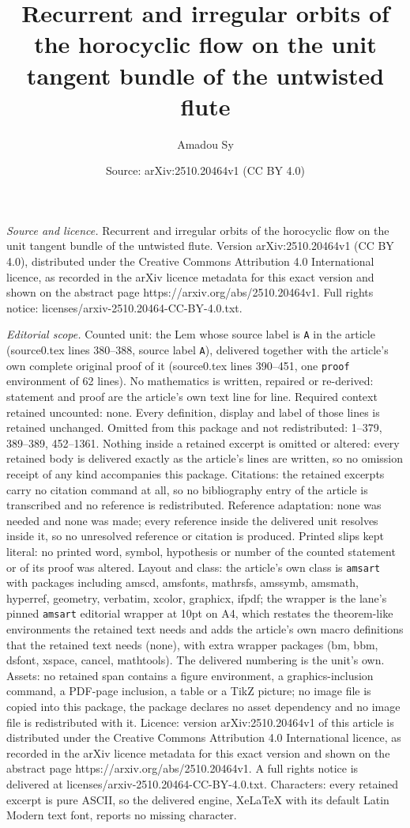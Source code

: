 \documentclass[10pt,a4paper]{amsart}
\title[Recurrent and irregular orbits of the horocyclic flow on the]{Recurrent and irregular orbits of the horocyclic flow on the unit tangent bundle of the untwisted flute}
\author{Amadou Sy}
\date{Source: arXiv:2510.20464v1 (CC BY 4.0)}
\begin{document}
\maketitle

\noindent\emph{Source and licence.} Recurrent and irregular orbits of the horocyclic flow on the unit tangent bundle of the untwisted flute. Version arXiv:2510.20464v1 (CC BY 4.0), distributed under the Creative Commons Attribution 4.0 International licence, as recorded in the arXiv licence metadata for this exact version and shown on the abstract page https://arxiv.org/abs/2510.20464v1. Full rights notice: licenses/arxiv-2510.20464-CC-BY-4.0.txt.\par\smallskip

\noindent\textit{Editorial scope.} Counted unit: the Lem whose source label is \texttt{A} in the article (source0.tex lines 380--388, source label \texttt{A}), delivered together with the article's own complete original proof of it (source0.tex lines 390--451, one \texttt{proof} environment of 62 lines). No mathematics is written, repaired or re-derived: statement and proof are the article's own text line for line. Required context retained uncounted: none. Every definition, display and label of those lines is retained unchanged. Omitted from this package and not redistributed: 1--379, 389--389, 452--1361. Nothing inside a retained excerpt is omitted or altered: every retained body is delivered exactly as the article's lines are written, so no omission receipt of any kind accompanies this package. Citations: the retained excerpts carry no citation command at all, so no bibliography entry of the article is transcribed and no reference is redistributed. Reference adaptation: none was needed and none was made; every reference inside the delivered unit resolves inside it, so no unresolved reference or citation is produced. Printed slips kept literal: no printed word, symbol, hypothesis or number of the counted statement or of its proof was altered. Layout and class: the article's own class is \texttt{amsart} with packages including amscd, amsfonts, mathrsfs, amssymb, amsmath, hyperref, geometry, verbatim, xcolor, graphicx, ifpdf; the wrapper is the lane's pinned \texttt{amsart} editorial wrapper at 10pt on A4, which restates the theorem-like environments the retained text needs and adds the article's own macro definitions that the retained text needs (none), with extra wrapper packages (bm, bbm, dsfont, xspace, cancel, mathtools). The delivered numbering is the unit's own. Assets: no retained span contains a figure environment, a graphics-inclusion command, a PDF-page inclusion, a table or a TikZ picture; no image file is copied into this package, the package declares no asset dependency and no image file is redistributed with it. Licence: version arXiv:2510.20464v1 of this article is distributed under the Creative Commons Attribution 4.0 International licence, as recorded in the arXiv licence metadata for this exact version and shown on the abstract page https://arxiv.org/abs/2510.20464v1. A full rights notice is delivered at licenses/arxiv-2510.20464-CC-BY-4.0.txt. Characters: every retained excerpt is pure ASCII, so the delivered engine, XeLaTeX with its default Latin Modern text font, reports no missing character.
\end{document}
